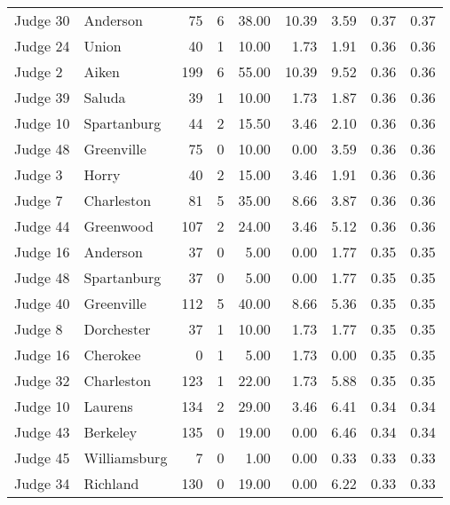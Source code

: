 \begin{tabular}{llrrrrrrr}
Judge 30 &     Anderson &    75 &      6 & 38.00 &      10.39 &      3.59 &         0.37 &      0.37 \\
Judge 24 &        Union &    40 &      1 & 10.00 &       1.73 &      1.91 &         0.36 &      0.36 \\
 Judge 2 &        Aiken &   199 &      6 & 55.00 &      10.39 &      9.52 &         0.36 &      0.36 \\
Judge 39 &       Saluda &    39 &      1 & 10.00 &       1.73 &      1.87 &         0.36 &      0.36 \\
Judge 10 &  Spartanburg &    44 &      2 & 15.50 &       3.46 &      2.10 &         0.36 &      0.36 \\
Judge 48 &   Greenville &    75 &      0 & 10.00 &       0.00 &      3.59 &         0.36 &      0.36 \\
 Judge 3 &        Horry &    40 &      2 & 15.00 &       3.46 &      1.91 &         0.36 &      0.36 \\
 Judge 7 &   Charleston &    81 &      5 & 35.00 &       8.66 &      3.87 &         0.36 &      0.36 \\
Judge 44 &    Greenwood &   107 &      2 & 24.00 &       3.46 &      5.12 &         0.36 &      0.36 \\
Judge 16 &     Anderson &    37 &      0 &  5.00 &       0.00 &      1.77 &         0.35 &      0.35 \\
Judge 48 &  Spartanburg &    37 &      0 &  5.00 &       0.00 &      1.77 &         0.35 &      0.35 \\
Judge 40 &   Greenville &   112 &      5 & 40.00 &       8.66 &      5.36 &         0.35 &      0.35 \\
 Judge 8 &   Dorchester &    37 &      1 & 10.00 &       1.73 &      1.77 &         0.35 &      0.35 \\
Judge 16 &     Cherokee &     0 &      1 &  5.00 &       1.73 &      0.00 &         0.35 &      0.35 \\
Judge 32 &   Charleston &   123 &      1 & 22.00 &       1.73 &      5.88 &         0.35 &      0.35 \\
Judge 10 &      Laurens &   134 &      2 & 29.00 &       3.46 &      6.41 &         0.34 &      0.34 \\
Judge 43 &     Berkeley &   135 &      0 & 19.00 &       0.00 &      6.46 &         0.34 &      0.34 \\
Judge 45 & Williamsburg &     7 &      0 &  1.00 &       0.00 &      0.33 &         0.33 &      0.33 \\
Judge 34 &     Richland &   130 &      0 & 19.00 &       0.00 &      6.22 &         0.33 &      0.33 \\

\end{tabular}
